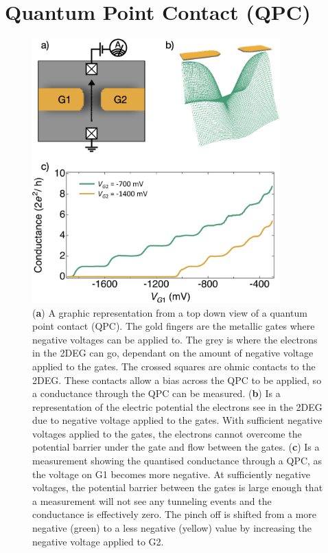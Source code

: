 \afterpage{\clearpage}
\section{Quantum Point Contact (QPC)}

\begin{figure}[!htb]
  \begin{center}
    \includegraphics[width=0.85\textwidth]{figures/ch1/crop_FiguresMaster.003.png}
    \caption[Conductance through a quantum point contact]{\label{fig:ch1/qpc_intro} 
    (\textbf{a}) A graphic representation from a top down view of a quantum point contact (QPC). The gold fingers are the metallic gates where negative voltages can be applied to. The grey is where the electrons in the 2DEG can go, dependant on the amount of negative voltage applied to the gates. The crossed squares are ohmic contacts to the 2DEG. These contacts allow a bias across the QPC to be applied, so a conductance through the QPC can be measured. (\textbf{b}) Is a representation of the electric potential the electrons see in the 2DEG due to negative voltage applied to the gates. With sufficient negative voltages applied to the gates, the electrons cannot overcome the potential barrier under the gate and flow between the gates. (\textbf{c}) Is a measurement showing the quantised conductance through a QPC, as the voltage on G1 becomes more negative. At sufficiently negative voltages, the potential barrier between the gates is large enough that a measurement will not see any tunneling events and the conductance is effectively zero. The pinch off is shifted from a more negative (green) to a less negative (yellow) value by increasing the negative voltage applied to G2.
      }
  \end{center}
\end{figure}

